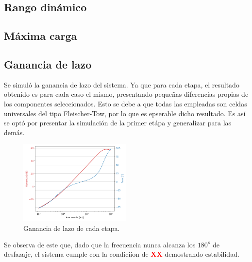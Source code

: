 \subsection{Rango dinámico}

\subsection{Máxima carga}

\subsection{Ganancia de lazo}
Se simuló la ganancia de lazo del sistema. Ya que para cada etapa, el resultado obtenído es para cada caso el mismo, presentando pequeñas diferencias propias de los componentes seleccionados. Esto se debe a que todas las empleadas son celdas universales del tipo Fleischer-Tow, por lo que es epserable dicho resultado. Es así se optó por presentar la simulación de la primer etápa y generalizar para las demás.
\begin{figure}[H]
\centering
	\includegraphics[width=0.5\textwidth]{Imagenes/GananciaDeLazo.png}
	\caption{Ganancia de lazo de cada etapa.}
\label{fig:lazo}
\end{figure}

Se observa de este que, dado que la frecuencia nunca alcanza los $180^o$ de desfazaje, el sistema cumple con la condiciíon de \textcolor{red}{\textbf{XX}} demostrando estabilidad.


